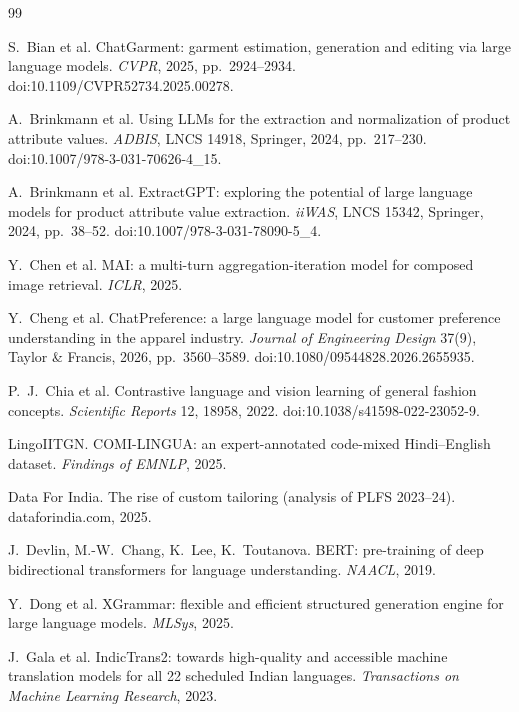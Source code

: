 \begingroup
\small
\setlength{\itemsep}{2pt}
\begin{thebibliography}{99}
\setlength{\itemsep}{3pt}

 S.~Bian et al. ChatGarment: garment estimation, generation and editing via large language models. \emph{CVPR}, 2025, pp.~2924--2934. doi:10.1109/CVPR52734.2025.00278.

 A.~Brinkmann et al. Using LLMs for the extraction and normalization of product attribute values. \emph{ADBIS}, LNCS 14918, Springer, 2024, pp.~217--230. doi:10.1007/978-3-031-70626-4\_15.

 A.~Brinkmann et al. ExtractGPT: exploring the potential of large language models for product attribute value extraction. \emph{iiWAS}, LNCS 15342, Springer, 2024, pp.~38--52. doi:10.1007/978-3-031-78090-5\_4.

 Y.~Chen et al. MAI: a multi-turn aggregation-iteration model for composed image retrieval. \emph{ICLR}, 2025.

 Y.~Cheng et al. ChatPreference: a large language model for customer preference understanding in the apparel industry. \emph{Journal of Engineering Design} 37(9), Taylor \& Francis, 2026, pp.~3560--3589. doi:10.1080/09544828.2026.2655935.

 P.~J.~Chia et al. Contrastive language and vision learning of general fashion concepts. \emph{Scientific Reports} 12, 18958, 2022. doi:10.1038/s41598-022-23052-9.

 LingoIITGN. COMI-LINGUA: an expert-annotated code-mixed Hindi--English dataset. \emph{Findings of EMNLP}, 2025.

 Data For India. The rise of custom tailoring (analysis of PLFS 2023--24). dataforindia.com, 2025.

 J.~Devlin, M.-W.~Chang, K.~Lee, K.~Toutanova. BERT: pre-training of deep bidirectional transformers for language understanding. \emph{NAACL}, 2019.

 Y.~Dong et al. XGrammar: flexible and efficient structured generation engine for large language models. \emph{MLSys}, 2025.

 J.~Gala et al. IndicTrans2: towards high-quality and accessible machine translation models for all 22 scheduled Indian languages. \emph{Transactions on Machine Learning Research}, 2023.


\end{thebibliography}
